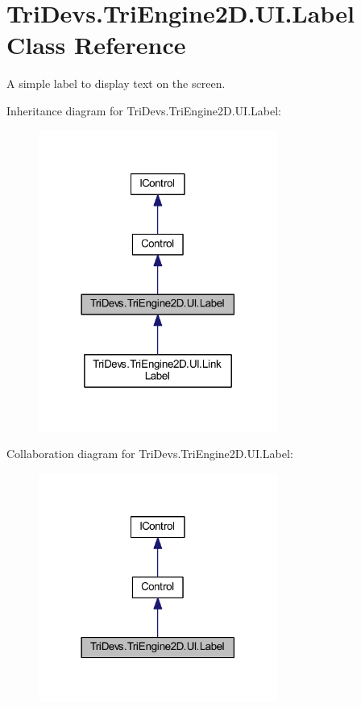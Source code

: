 \hypertarget{class_tri_devs_1_1_tri_engine2_d_1_1_u_i_1_1_label}{\section{Tri\-Devs.\-Tri\-Engine2\-D.\-U\-I.\-Label Class Reference}
\label{class_tri_devs_1_1_tri_engine2_d_1_1_u_i_1_1_label}
}


A simple label to display text on the screen.  




Inheritance diagram for Tri\-Devs.\-Tri\-Engine2\-D.\-U\-I.\-Label\-:
\nopagebreak
\begin{figure}[H]
\begin{center}
\leavevmode
\includegraphics[width=222pt]{class_tri_devs_1_1_tri_engine2_d_1_1_u_i_1_1_label__inherit__graph}
\end{center}
\end{figure}


Collaboration diagram for Tri\-Devs.\-Tri\-Engine2\-D.\-U\-I.\-Label\-:
\nopagebreak
\begin{figure}[H]
\begin{center}
\leavevmode
\includegraphics[width=222pt]{class_tri_devs_1_1_tri_engine2_d_1_1_u_i_1_1_label__coll__graph}
\end{center}
\end{figure}
